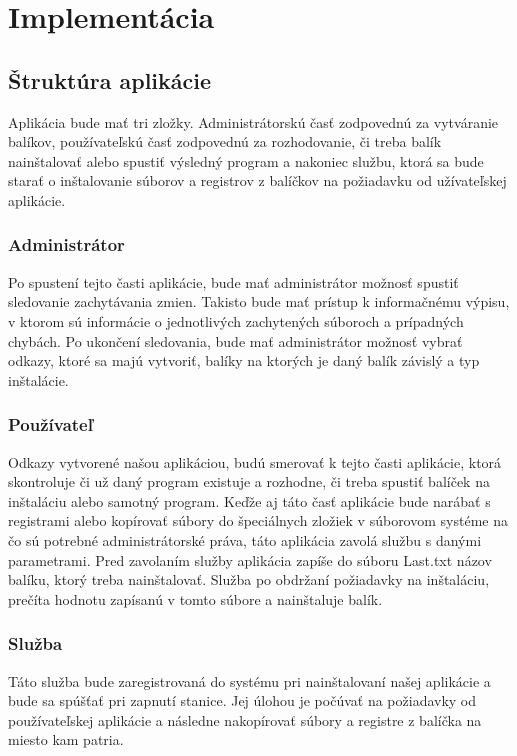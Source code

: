 \chapter{Implementácia}

\section{Štruktúra aplikácie}

Aplikácia bude mať tri zložky. Administrátorskú časť zodpovednú za vytváranie balíkov, používateľskú časť zodpovednú za rozhodovanie, či treba balík nainštalovať alebo spustiť výsledný program a nakoniec službu, ktorá sa bude starať o inštalovanie súborov a registrov z balíčkov na požiadavku od užívateľskej aplikácie.
\subsection{Administrátor}
Po spustení tejto časti aplikácie, bude mať administrátor možnosť spustiť sledovanie zachytávania zmien. Takisto bude mať prístup k informačnému výpisu, v ktorom sú informácie o jednotlivých zachytených súboroch a prípadných chybách. Po ukončení sledovania, bude mať administrátor možnosť vybrať odkazy, ktoré sa majú vytvoriť, balíky na ktorých je daný balík závislý a typ inštalácie.
\subsection{Používateľ}
Odkazy vytvorené našou aplikáciou, budú smerovať k tejto časti aplikácie, ktorá skontroluje či už daný program existuje a rozhodne, či treba spustiť balíček na inštaláciu alebo samotný program. Keďže aj táto časť aplikácie bude narábať s registrami alebo kopírovať súbory do špeciálnych zložiek v súborovom systéme na čo sú potrebné administrátorské práva, táto aplikácia zavolá službu s danými parametrami. Pred zavolaním služby aplikácia zapíše do súboru Last.txt názov balíku, ktorý treba nainštalovať. Služba po obdržaní požiadavky na inštaláciu, prečíta hodnotu zapísanú v tomto súbore a nainštaluje balík.
\subsection{Služba}
Táto služba bude zaregistrovaná do systému pri nainštalovaní našej aplikácie a bude sa spúšťať pri zapnutí stanice. Jej úlohou je počúvať na požiadavky od používateľskej aplikácie a následne nakopírovať súbory a registre z balíčka na miesto kam patria.
